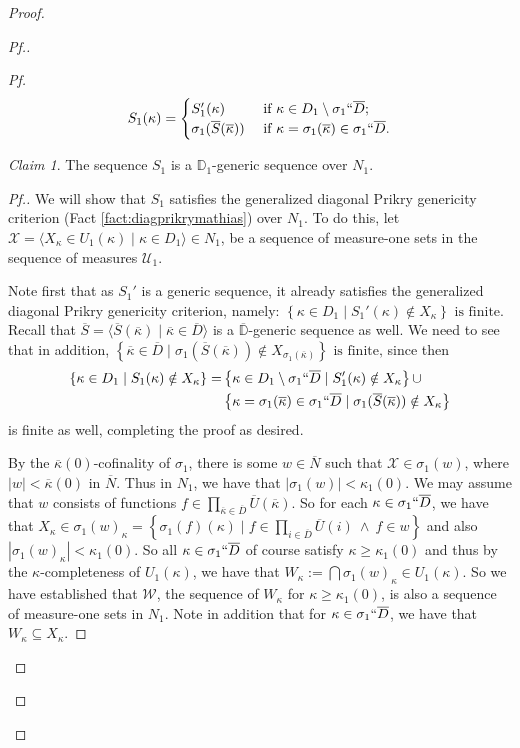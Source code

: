 \documentclass{amsart}
\theoremstyle{definition}
\theoremstyle{remark}
\newtheorem{claimno}{Claim}
\newcommand{\D}{\mathbb{D}}
\newcommand{\N}{{\overline{N}}}
\renewcommand{\S}{{\overline{S}}}
\newcommand{\U}{\mathcal{U}}
\newcommand{\st}{\; | \;}
\newcommand{\set}[2]{\left\{#1\st #2 \right\}}
\newcommand{\seq}[2]{\langle #1 \st #2 \rangle}
\begin{document}
\begin{proof}
\begin{proof}[Pf.]
\begin{proof}[Pf]
$$S_1(\kappa) = \begin{cases} S_1'(\kappa) &\text{ if } \kappa \in D_1 \setminus \sigma_1``\overline D; \\
					\sigma_1(\overline S(\overline \kappa)) &\text{ if } \kappa = \sigma_1(\overline \kappa) \in \sigma_1``\overline D. \end{cases}$$

\begin{claimno} \label{Claim:S_1isPrikryoverN_1} The sequence $S_1$ is a $\D_1$-generic sequence over $N_1$. \end{claimno}
\begin{proof}[Pf.]
We will show that $S_1$ satisfies the generalized diagonal Prikry genericity criterion (Fact \ref{fact:diagprikrymathias}) over $N_1$. To do this, let $\mathcal X = \seq{ X_\kappa \in U_1(\kappa) }{ \kappa \in D_1 } \in N_1$, be a sequence of measure-one sets in the sequence of measures $\U_1$.

Note first that as $S_1'$ is a generic sequence, it already satisfies the generalized diagonal Prikry genericity criterion, namely:
$\set{ \kappa \in D_1}{ S_1'(\kappa) \notin X_\kappa } \text{ is finite.}$
Recall that $\S = \seq{ \S(\overline \kappa) }{ \overline \kappa \in \overline D }$ is a $\overline{\D}$-generic sequence as well.
We need to see that in addition,
$\set{ \overline \kappa \in \overline D}{\sigma_1(\S(\overline \kappa)) \notin X_{\sigma_1(\overline \kappa)} }  \text{ is finite,}$
since then 
\begin{align*}
\set{ \kappa \in D_1}{ S_1(\kappa) \notin X_\kappa } = & \set{ \kappa \in D_1 \setminus \sigma_1``\overline D}{ S_1'(\kappa) \notin X_\kappa } \cup\\
& \set{ \kappa = \sigma_1(\overline \kappa) \in \sigma_1``\overline D}{\sigma_1(\S(\overline \kappa)) \notin X_\kappa }
\end{align*}
is finite as well, completing the proof as desired.

By the $\overline{\kappa}(0)$-cofinality of $\sigma_1$, there is some $w \in \N$ such that $\mathcal X \in \sigma_1(w)$, where $|w| < \overline{\kappa}(0)$ in $\N$. Thus in $N_1$, we have that $|\sigma_1(w)| < \kappa_1(0)$. 
We may assume that $w$ consists of functions $f \in \prod_{\overline \kappa \in \overline D} \overline U(\overline \kappa)$.
So for each $\kappa \in \sigma_1``\overline D$, we have that $X_\kappa \in \sigma_1(w)_\kappa = \set{\sigma_1(f)(\kappa) }{ f \in \prod_{i \in \overline D} \overline U(i) \ \land \ f \in w }$ and also $|\sigma_1(w)_\kappa|<\kappa_1(0).$ So all $\kappa \in \sigma_1``\overline D$ of course satisfy $\kappa \geq \kappa_1(0)$ and thus by the $\kappa$-completeness of $U_1(\kappa)$, we have that $W_\kappa := \bigcap \sigma_1(w)_\kappa \in  U_1(\kappa).$
So we have established that $\mathcal W$, the sequence of $W_\kappa$ for $\kappa \geq \kappa_1(0)$, is also a sequence of measure-one sets in $N_1$. Note in addition that for $\kappa \in \sigma_1``\overline D$, we have that $W_\kappa \subseteq X_\kappa$. 


\end{proof}
\end{proof}
\end{proof}
\end{proof}
\end{document}
